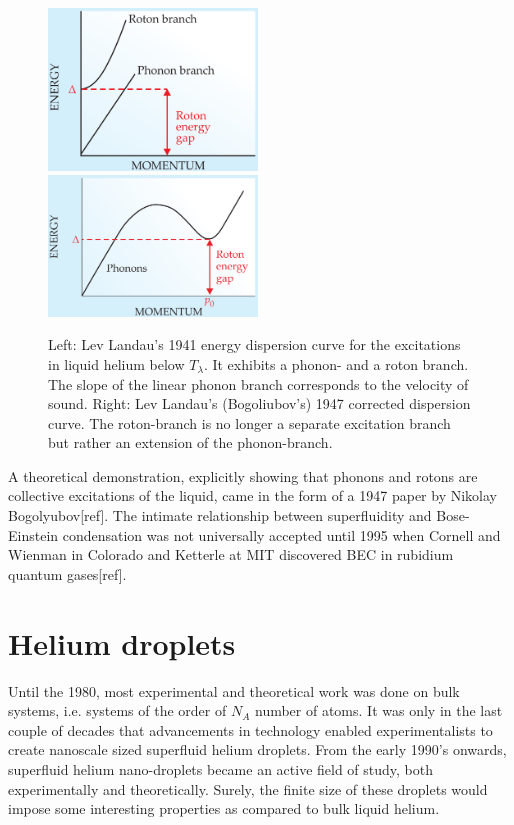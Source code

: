 \documentclass[11pt,a4paper,twoside]{article}
\begin{document}
		\begin{figure}[t]
			\begin{center}
				\includegraphics[width=0.495\textwidth]{phonon-roton-landau-first}
				\includegraphics[width=0.495\textwidth]{phonon-roton-bogoliubov}
			\end{center}
			\caption{Left: Lev Landau's 1941 energy dispersion curve for the excitations in liquid helium below $T_\lambda$. It exhibits a phonon- and a roton branch. The slope of the linear phonon branch corresponds to the velocity of sound. Right: Lev Landau's (Bogoliubov's) 1947 corrected dispersion curve. The roton-branch is no longer a separate excitation branch but rather an extension of the phonon-branch.}
			\label{fig:phonon-roton}
		\end{figure}

		A theoretical demonstration, explicitly showing that phonons and rotons are collective excitations of the liquid, came in the form of a 1947 paper by Nikolay Bogolyubov[ref]. The intimate relationship between superfluidity and Bose-Einstein condensation was not universally accepted until 1995 when Cornell and Wienman in Colorado and Ketterle at MIT discovered BEC in rubidium quantum gases[ref].
	
	\section{Helium droplets}
		Until the 1980, most experimental and theoretical work was done on bulk systems, i.e. systems of the order of $N_A$ number of atoms. It was only in the last couple of decades that advancements in technology enabled experimentalists to create nanoscale sized superfluid helium droplets. From the early 1990's onwards, superfluid helium nano-droplets became an active field of study, both experimentally and theoretically. Surely, the finite size of these droplets would impose some interesting properties as compared to bulk liquid helium.\\
		
\end{document}
